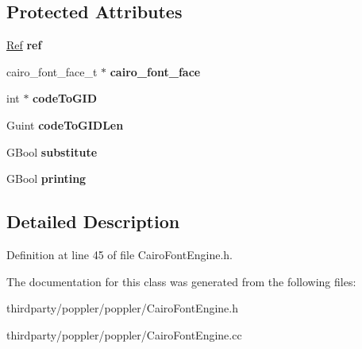 \subsection*{Protected Attributes}
\begin{DoxyCompactItemize}
\item 
\mbox{\label{class_cairo_font_a57bd0f3439a38edfa0e46f9ce5cf07e3}} 
\hyperlink{struct_ref}{Ref} {\bfseries ref}
\item 
\mbox{\label{class_cairo_font_a9c541b5a58c3c55502a6ff75d7002bad}} 
cairo\+\_\+font\+\_\+face\+\_\+t $\ast$ {\bfseries cairo\+\_\+font\+\_\+face}
\item 
\mbox{\label{class_cairo_font_a9f3e5bbf17e0b3c785c21ccd65bd7eaa}} 
int $\ast$ {\bfseries code\+To\+G\+ID}
\item 
\mbox{\label{class_cairo_font_a05734e9a3cea88c5963343a00fee6984}} 
Guint {\bfseries code\+To\+G\+I\+D\+Len}
\item 
\mbox{\label{class_cairo_font_a80b95a624ccf059e109bba51187c0ac6}} 
G\+Bool {\bfseries substitute}
\item 
\mbox{\label{class_cairo_font_a4a47c18ec99efe095b4c6dd54da9b02c}} 
G\+Bool {\bfseries printing}
\end{DoxyCompactItemize}


\subsection{Detailed Description}


Definition at line 45 of file Cairo\+Font\+Engine.\+h.



The documentation for this class was generated from the following files\+:\begin{DoxyCompactItemize}
\item 
thirdparty/poppler/poppler/Cairo\+Font\+Engine.\+h\item 
thirdparty/poppler/poppler/Cairo\+Font\+Engine.\+cc\end{DoxyCompactItemize}
